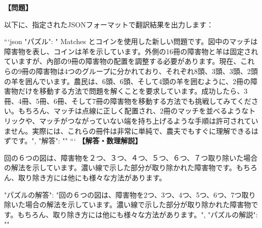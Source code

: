 \documentclass[10pt,a4paper,oneside,openany]{ltjsbook}
\begin{document}
\begin{tcolorbox}[colback=softblue,colframe=primaryblue,title=\textbf{第 275 問：THE SIXTEEN SHEEP.},arc=2mm,boxrule=1pt,breakable]
\textbf{【問題】}\par\vspace{0.3em}
以下に、指定されたJSONフォーマットで翻訳結果を出力します：

```json
{
    "パズル": " Matches とコインを使用した新しい問題です。図中のマッチは障害物を表し、コインは羊を示しています。外側の16冊の障害物と羊は固定されていますが、內部の9冊の障害物の配置を調整する必要があります。現在、これらの9冊の障害物は4つのグループに分かれており、それぞれ8頭、3頭、3頭、2頭の羊を囲んでいます。農民は、6頭、6頭、そして4頭の羊を囲むように、2冊の障害物だけを移動する方法で問題を解くことを要求しています。成功したら、3冊、4冊、5冊、6冊、そして7冊の障害物を移動する方法でも挑戦してみてください。もちろん、マッチは点線に正しく配置され、2冊のマッチを並べるようなトリックや、マッチがつながっていない端を持ち上げるような手順は許可されていません。実際には、これらの冊件は非常に単純で、農夫でもすぐに理解できるはずです。",
    "解答": ""
}
```
\tcblower
\textbf{【解答・数理解説】}\par\vspace{0.3em}
回の６つの図は、障害物を２つ、３つ、４つ、５つ、６つ、７つ取り除いた場合の解法を示しています。濃い線で示した部分が取り除かれた障害物です。もちろん、取り除き方には他にも様々な方法があります。

{
  "パズルの解答": "回の６つの図は、障害物を2つ、3つ、4つ、5つ、6つ、7つ取り除いた場合の解法を示しています。濃い線で示した部分が取り除かれた障害物です。もちろん、取り除き方には他にも様々な方法があります。",
  "パズルの解説": ""
}
\end{tcolorbox}
\end{document}
